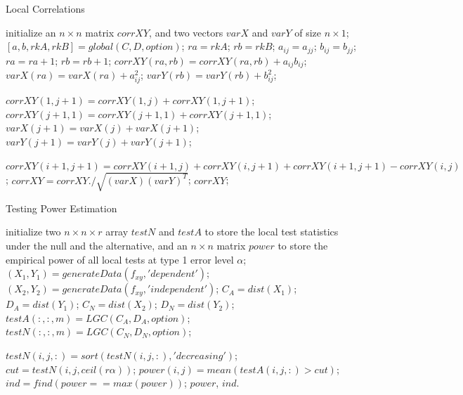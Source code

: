 \documentclass[11pt]{article}
\begin{document}
\begin{algorithm}
\caption{Local Correlations}
\label{algLGC}
\begin{algorithmic}
  
\State initialize an $n \times n$ matrix $corrXY$, and two vectors $varX$ and $varY$ of size $n \times 1$;
\State $[a,b,rkA,rkB]=global(C,D,option)$; 
\State $ra=rkA$; $rb=rkB$;
\State $a_{ij}=a_{jj}$; 
\EndIf
{}
\State $b_{ij}=b_{jj}$;
\EndIf
\State $ra=ra+1$; $rb=rb+1$;
\State $corrXY(ra, rb)=corrXY(ra, rb)+a_{ij}b_{ij}$;
\State $varX(ra)=varX(ra)+a_{ij}^2$;
\State $varY(rb)=varY(rb)+b_{ij}^2$;
\EndFor
\EndFor

\State $corrXY(1, j+1)=corrXY(1, j)+corrXY(1, j+1)$;
\State $corrXY(j+1,1)=corrXY(j+1,1)+corrXY(j+1,1)$;
\State $varX(j+1)=varX(j)+varX(j+1)$;
\State $varY(j+1)=varY(j)+varY(j+1)$;
\EndFor

\State $corrXY(i+1,j+1)=corrXY(i+1,j)+corrXY(i,j+1)+corrXY(i+1,j+1)-corrXY(i,j)$;
\EndFor
\EndFor
\State $corrXY=corrXY./\sqrt{(varX) (varY)^{T}}$; 
\State \Return $corrXY$;
\EndFunction
\end{algorithmic}
\end{algorithm}

\begin{algorithm}
\caption{Testing Power Estimation}
\label{algPower}
\begin{algorithmic}
\State initialize two $n \times n \times r$ array $testN$ and $testA$ to store the local test statistics under the null and the alternative, and an $n \times n$ matrix $power$ to store the empirical power of all local tests at type 1 error level $\alpha$;
\State $(X_{1},Y_{1})=generateData(f_{xy},'dependent')$; 
\State $(X_{2},Y_{2})=generateData(f_{xy},'independent')$; 
\State $C_{A}=dist(X_{1})$; $D_{A}=dist(Y_{1})$; 
\State $C_{N}=dist(X_{2})$; $D_{N}=dist(Y_{2})$; 
\State $testA(:,:,m)=LGC(C_{A},D_{A},option)$; 
\State $testN(:,:,m)=LGC(C_{N},D_{N},option)$;
\EndFor

\State $testN(i,j,:)=sort(testN(i,j,:),'decreasing')$; 
\State $cut=testN(i,j,ceil(r\alpha))$; 
\State $power(i,j)=mean(testA(i,j,:)>cut)$; 
\EndFor
\EndFor
\State $ind=find(power==max(power))$; 
\State \Return $power$, $ind$.
\EndFunction
\end{algorithmic}
\end{algorithm}
\end{document}
